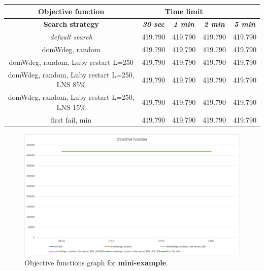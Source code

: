 {
\renewcommand{\arraystretch}{2}
\begin{longtable}[h]{| c | c | c | c | c |}
    \hline
    \textbf{Objective function} & \multicolumn{3}{c}{\textbf{Time limit}} & \\
    \hline
    \textbf{Search strategy} & \textbf{\textit{30 sec}} & \textbf{\textit{1 min}} & \textbf{\textit{2 min}} & \textbf{\textit{5 min}} \\
    \hline
    \endhead
    \textit{default search}                       & 419.790 & 419.790 & 419.790 & 419.790 \\
    \hline
    domWdeg, random                               & 419.790 & 419.790 & 419.790 & 419.790 \\
    \hline
    domWdeg, random, Luby restart L=250           & 419.790 & 419.790 & 419.790 & 419.790 \\
    \hline
    domWdeg, random, Luby restart L=250, LNS 85\% & 419.790 & 419.790 & 419.790 & 419.790 \\
    \hline
    domWdeg, random, Luby restart L=250, LNS 15\% & 419.790 & 419.790 & 419.790 & 419.790 \\
    \hline
    first fail, min                               & 419.790 & 419.790 & 419.790 & 419.790 \\
    \hline
\end{longtable}
}

\begin{figure}[H]
    \centering
    \includegraphics[width=0.8\columnwidth]{../graphs/mini-example-objf.png}
    \caption{Objective functions graph for \textbf{mini-example}.}
\end{figure}

